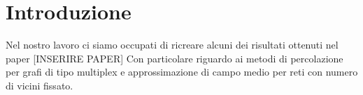 \section{Introduzione}\label{sec:introduzione}
Nel nostro lavoro ci siamo occupati di ricreare alcuni dei risultati ottenuti nel paper [INSERIRE PAPER]
Con particolare riguardo ai metodi di percolazione per grafi di tipo multiplex e approssimazione di 
campo medio per reti con numero di vicini fissato.